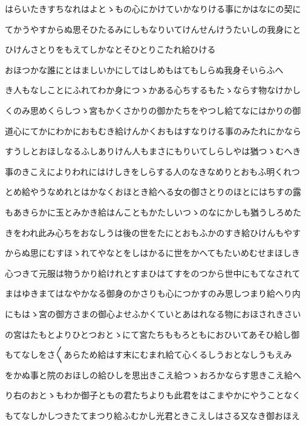 \documentclass[a4paper,11pt,landscape]{ltjtarticle}
\begin{document}
\par\medskip
はらいたきすちなれはよとゝもの心にかけていかなりける事にかはなにの契に
\par\medskip
てかうやすからぬ思そひたるみにしもなりいてけんせんけうたいしの我身にと
\par\medskip
ひけんさとりをもえてしかなとそひとりこたれ給ひける
\par\medskip
おほつかな誰にとはましいかにしてはしめもはてもしらぬ我身そいらふへ
\par\medskip
き人もなしことにふれてわか身につゝかある心ちするもたゝならす物なけかし
\par\medskip
くのみ思めくらしつゝ宮もかくさかりの御かたちをやつし給てなにはかりの御
\par\medskip
道心にてかにわかにおもむき給けんかくおもはすなりける事のみたれにかなら
\par\medskip
すうしとおほしなるふしありけん人もまさにもりいてしらしやは猶つゝむへき
\par\medskip
事のきこえによりわれにはけしきをしらする人のなきなめりとおもふ明くれつ
\par\medskip
とめ給やうなめれとはかなくおほとき給へる女の御さとりのほとにはちすの露
\par\medskip
もあきらかに玉とみかき給はんこともかたしいつゝのなにかしも猶うしろめた
\par\medskip
きをわれ此み心ちをおなしうは後の世をたにとおもふかのすき給ひけんもやす
\par\medskip
からぬ思にむすほゝれてやなとをしはかるに世をかへてもたいめむせまほしき
\par\medskip
心つきて元服は物うかり給けれとすまひはてすをのつから世中にもてなされて
\par\medskip
まはゆきまてはなやかなる御身のかさりも心につかすのみ思しつまり給へり内
\par\medskip
にもはゝ宮の御方さまの御心よせふかくていとあはれなる物におほされきさい
\par\medskip
の宮はたもとよりひとつおとゝにて宮たちももろともにおひいてあそひ給し御
\par\medskip
もてなしをさ〱あらため給はす末にむまれ給て心くるしうおとなしうもえみ
\par\medskip
をかぬ事と院のおほしの給ひしを思出きこえ給つゝおろかならす思きこえ給へ
\par\medskip
り右のおとゝもわか御子ともの君たちよりも此君をはこまやかにやうことなく
\par\medskip
もてなしかしつきたてまつり給ふむかし光君ときこえしはさる又なき御おほえ
\par\medskip
\end{document}
